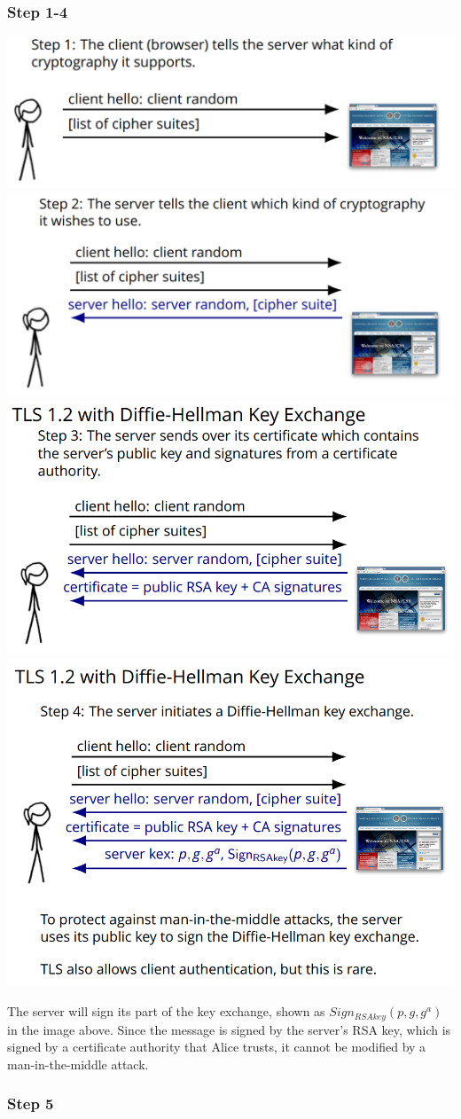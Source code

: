 \documentclass[11pt]{article} %
\begin{document}
\subsubsection{Step 1-4}
\begin{center}
  \includegraphics[width=.54\linewidth]{./DiffieStep1.png} 
  \includegraphics[width=.54\linewidth]{./DiffieStep2.png}
  \includegraphics[width=.54\linewidth]{./DiffieStep3.png} 
  \includegraphics[width=.54\linewidth]{./DiffieStep4.png}
\end{center}

\noindent The server will sign its part of the key exchange, shown as 
$Sign_{RSAkey}(p,g,g^a)$ in the image above. Since the message is signed by 
the server's RSA key, which is signed by a certificate authority that Alice 
trusts, it cannot be modified by a man-in-the-middle attack.

\subsubsection{Step 5}
\end{document}
